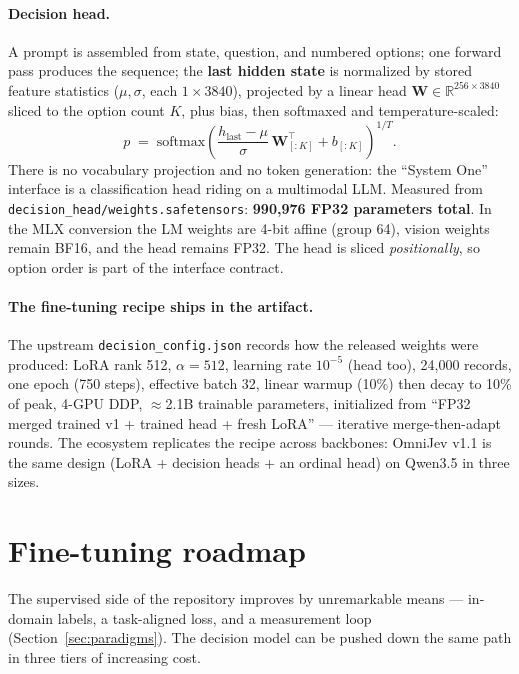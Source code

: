 \documentclass[11pt]{article}
\newcommand{\code}[1]{\texttt{#1}}
\begin{document}
\paragraph{Decision head.} A prompt is assembled from state, question, and
numbered options; one forward pass produces the sequence; the \textbf{last
hidden state} is normalized by stored feature statistics ($\mu,\sigma$,
each $1\times3840$), projected by a linear head
$\mathbf{W} \in \mathbb{R}^{256\times3840}$ sliced to the option count $K$,
plus bias, then softmaxed and temperature-scaled:
\begin{equation}
p \;=\; \mathrm{softmax}\!\left(
\frac{h_{\text{last}} - \mu}{\sigma}\,\mathbf{W}_{[:K]}^{\top} + b_{[:K]}
\right)^{1/T}.
\end{equation}
There is no vocabulary projection and no token generation: the ``System One''
interface is a classification head riding on a multimodal LLM. Measured from
\code{decision\_head/weights.safetensors}: \textbf{990{,}976 FP32 parameters
total}. In the MLX conversion the LM weights are 4-bit affine (group 64),
vision weights remain BF16, and the head remains FP32. The head is sliced
\emph{positionally}, so option order is part of the interface contract.

\paragraph{The fine-tuning recipe ships in the artifact.} The upstream
\code{decision\_config.json} records how the released weights were produced:
LoRA rank 512, $\alpha{=}512$, learning rate $10^{-5}$ (head too), 24{,}000
records, one epoch (750 steps), effective batch 32, linear warmup (10\%) then
decay to 10\% of peak, 4-GPU DDP, $\approx$2.1B trainable parameters,
initialized from ``FP32 merged trained v1 + trained head + fresh LoRA'' ---
iterative merge-then-adapt rounds. The ecosystem replicates the recipe across
backbones: OmniJev v1.1 is the same design (LoRA + decision heads + an
ordinal head) on Qwen3.5 in three sizes.

\section{Fine-tuning roadmap}
\label{sec:finetune}

The supervised side of the repository improves by unremarkable means ---
in-domain labels, a task-aligned loss, and a measurement loop
(Section~\ref{sec:paradigms}). The decision model can be pushed down the same
path in three tiers of increasing cost.
\end{document}
